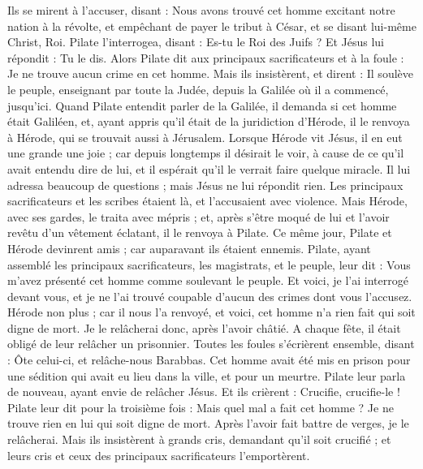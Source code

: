 \begin{multicols}{2}
{Ils se mirent à l'accuser, disant : Nous avons trouvé cet homme excitant notre nation à la révolte, et empêchant de payer le tribut à César, et se disant lui-même Christ, Roi.
Pilate l'interrogea, disant : Es-tu le Roi des Juifs ? Et Jésus lui répondit : Tu le dis.
Alors Pilate dit aux principaux sacrificateurs et à la foule : Je ne trouve aucun crime en cet homme.
Mais ils insistèrent, et dirent : Il soulève le peuple, enseignant par toute la Judée, depuis la Galilée où il a commencé, jusqu’ici.
Quand Pilate entendit parler de la Galilée, il demanda si cet homme était Galiléen,
et, ayant appris qu'il était de la juridiction d'Hérode, il le renvoya à Hérode, qui se trouvait aussi à Jérusalem.
Lorsque Hérode vit Jésus, il en eut une grande une joie ; car depuis longtemps il désirait le voir, à cause de ce qu’il avait entendu dire de lui, et il espérait qu'il le verrait faire quelque miracle.
Il lui adressa beaucoup de questions ; mais Jésus ne lui répondit rien.
Les principaux sacrificateurs et les scribes étaient là, et l’accusaient avec violence.
Mais Hérode, avec ses gardes, le traita avec mépris ; et, après s’être moqué de lui et l’avoir revêtu d'un vêtement éclatant, il le renvoya à Pilate.
Ce même jour, Pilate et Hérode devinrent amis ; car auparavant ils étaient ennemis.
Pilate, ayant assemblé les principaux sacrificateurs, les magistrats, et le peuple, leur dit :
Vous m'avez présenté cet homme comme soulevant le peuple. Et voici, je l’ai interrogé devant vous, et je ne l’ai trouvé coupable d’aucun des crimes dont vous l'accusez.
Hérode non plus ; car il nous l’a renvoyé, et voici, cet homme n’a rien fait qui soit digne de mort.
Je le relâcherai donc, après l’avoir châtié.
A chaque fête, il était obligé de leur relâcher un prisonnier.
Toutes les foules s'écrièrent ensemble, disant : Ôte celui-ci, et relâche-nous Barabbas.
Cet homme avait été mis en prison pour une sédition qui avait eu lieu dans la ville, et pour un meurtre.
Pilate leur parla de nouveau, ayant envie de relâcher Jésus.
Et ils crièrent : Crucifie, crucifie-le !
Pilate leur dit pour la troisième fois : Mais quel mal a fait cet homme ? Je ne trouve rien en lui qui soit digne de mort. Après l’avoir fait battre de verges, je le relâcherai.
Mais ils insistèrent à grands cris, demandant qu'il soit crucifié ; et leurs cris et ceux des principaux sacrificateurs l’emportèrent.
}
\end{multicols}
